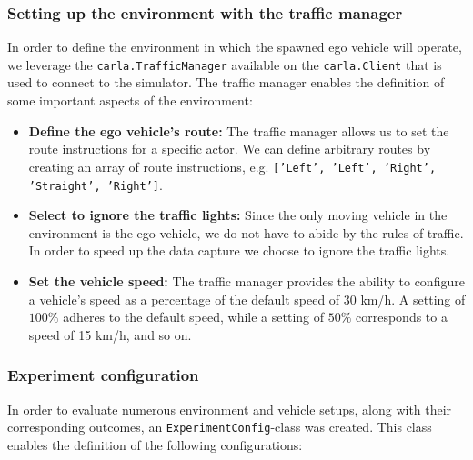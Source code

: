 \subsubsection{Setting up the environment with the traffic manager}

In order to define the environment in which the spawned ego vehicle will operate, we leverage the \texttt{carla.TrafficManager} available on the \texttt{carla.Client} that is used to connect to the simulator. The traffic manager enables the definition of some important aspects of the environment:

\begin{itemize}
    \item \textbf{Define the ego vehicle's route:} The traffic manager allows us to set the route instructions for a specific actor. We can define arbitrary routes by creating an array of route instructions, e.g. \texttt{['Left', 'Left', 'Right', 'Straight', 'Right']}.
    \item \textbf{Select to ignore the traffic lights:} Since the only moving vehicle in the environment is the ego vehicle, we do not have to abide by the rules of traffic. In order to speed up the data capture we choose to ignore the traffic lights.
    \item \textbf{Set the vehicle speed:} The traffic manager provides the ability to configure a vehicle’s speed as a percentage of the default speed of 30 km/h. A setting of $100\%$ adheres to the default speed, while a setting of $50\%$ corresponds to a speed of 15 km/h, and so on.
\end{itemize}


\subsubsection{Experiment configuration}
In order to evaluate numerous environment and vehicle setups, along with their corresponding outcomes, an \texttt{ExperimentConfig}-class was created. This class enables the definition of the following configurations:

